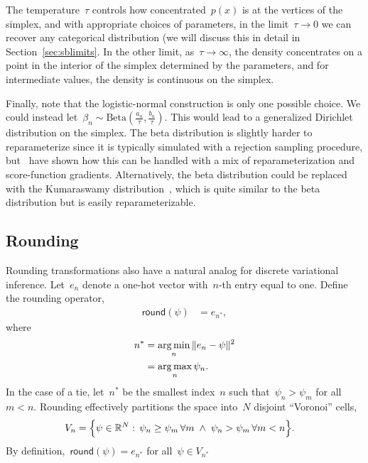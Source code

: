 The temperature~$\tau$ controls how concentrated~$p(x)$ is at the
vertices of the simplex, and with appropriate choices of parameters,
in the limit~${\tau \to 0}$ we can recover any categorical
distribution (we will discuss this in detail in
Section~\ref{sec:sblimits}. In the other limit, as~$\tau \to \infty$,
the density concentrates on a point in the interior of the simplex
determined by the parameters, and for intermediate values, the density
is continuous on the simplex.

Finally, note that the logistic-normal construction is only one
possible choice.  We could instead
let~${\beta_n \sim \mathrm{Beta}(\tfrac{a_n}{\tau},
  \tfrac{b_n}{\tau})}$. This would lead to a generalized Dirichlet
distribution on the simplex.  The beta distribution is slightly harder
to reparameterize since it is typically simulated with a rejection
sampling procedure, but~\citet{naesseth2017reparameterization} have
shown how this can be handled with a mix of reparameterization and
score-function gradients.  Alternatively, the beta distribution could
be replaced with the Kumaraswamy
distribution~\citep{kumaraswamy1980generalized}, which is quite
similar to the beta distribution but is easily reparameterizable.

\subsection{Rounding}
Rounding transformations also have a natural analog for discrete
variational inference.  Let~$e_n$ denote a one-hot vector with~$n$-th
entry equal to one.  Define the rounding operator,
\begin{align*}
  \mathsf{round}(\psi)
  &= e_{n^*},
\end{align*}
where
\begin{align*}
  n^* &= \argmin_{n} \|e_n - \psi \|^2 \\
  &= \argmax_n \psi_n.
\end{align*}
In the case of a tie, let~$n^*$ be the smallest index~$n$ such
that~$\psi_n > \psi_m$ for all~$m < n$. Rounding effectively
partitions the space into~$N$ disjoint ``Voronoi'' cells,
\begin{align*}
  V_n &= \Big \{ \psi \in \mathbb{R}^N : \,
        \psi_n \geq \psi_m \, \forall m \; \wedge \;
        \psi_n > \psi_m \, \forall m < n
        \Big \}.
\end{align*}
By definition,~${\mathsf{round}(\psi) = e_{n^*}}$ for
all~${\psi \in V_{n^*}}$


